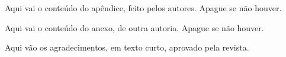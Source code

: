 \documentclass[12pt,a4paper,oneside]{article}
\begin{document}


Aqui vai o conteúdo do apêndice, feito pelos autores. Apague se não houver.

Aqui vai o conteúdo do anexo, de outra autoria. Apague se não houver.

Aqui vão os agradecimentos, em texto curto, aprovado pela revista.
\end{document}
